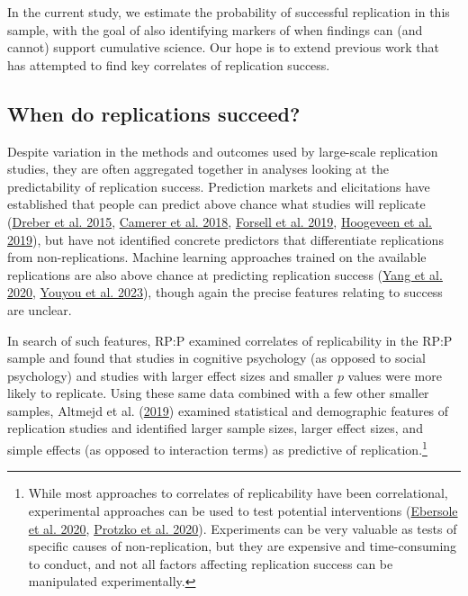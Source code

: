 \documentclass[
  english,
  a4paper,
]{article}
\begin{document}
In the current study, we estimate the probability of successful replication in this sample, with the goal of also identifying markers of when findings can (and cannot) support cumulative science. Our hope is to extend previous work that has attempted to find key correlates of replication success.

\hypertarget{when-do-replications-succeed}{%
\subsection{When do replications succeed?}\label{when-do-replications-succeed}}

Despite variation in the methods and outcomes used by large-scale replication studies, they are often aggregated together in analyses looking at the predictability of replication success. Prediction markets and elicitations have established that people can predict above chance what studies will replicate (\protect\hyperlink{ref-dreber2015}{Dreber et al. 2015}, \protect\hyperlink{ref-camerer2018}{Camerer et al. 2018}, \protect\hyperlink{ref-forsell2019}{Forsell et al. 2019}, \protect\hyperlink{ref-hoogeveen2019}{Hoogeveen et al. 2019}), but have not identified concrete predictors that differentiate replications from non-replications. Machine learning approaches trained on the available replications are also above chance at predicting replication success (\protect\hyperlink{ref-yang2020}{Yang et al. 2020}, \protect\hyperlink{ref-youyou2023}{Youyou et al. 2023}), though again the precise features relating to success are unclear.

In search of such features, RP:P examined correlates of replicability in the RP:P sample and found that studies in cognitive psychology (as opposed to social psychology) and studies with larger effect sizes and smaller \(p\) values were more likely to replicate. Using these same data combined with a few other smaller samples, Altmejd et al. (\protect\hyperlink{ref-altmejd2019}{2019}) examined statistical and demographic features of replication studies and identified larger sample sizes, larger effect sizes, and simple effects (as opposed to interaction terms) as predictive of replication.\footnote{While most approaches to correlates of replicability have been correlational, experimental approaches can be used to test potential interventions (\protect\hyperlink{ref-ebersole2020}{Ebersole et al. 2020}, \protect\hyperlink{ref-protzko2020}{Protzko et al. 2020}). Experiments can be very valuable as tests of specific causes of non-replication, but they are expensive and time-consuming to conduct, and not all factors affecting replication success can be manipulated experimentally.}
\end{document}
